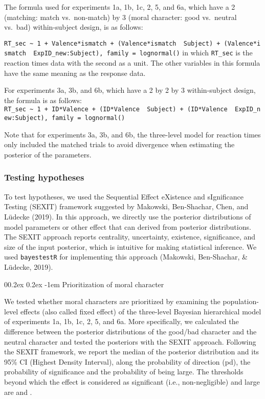 \documentclass[
  man]{apa6}
\makeatletter
\let\oldparagraph\paragraph
\renewcommand{\paragraph}[1]{\oldparagraph{#1}\mbox{}}
\renewcommand{\paragraph}{\@startsection{paragraph}{4}{\parindent}%
  {0\baselineskip \@plus 0.2ex \@minus 0.2ex}%
  {-1em}%
  {\normalfont\normalsize\bfseries\itshape\typesectitle}}
\makeatother
\begin{document}
The formula used for experiments 1a, 1b, 1c, 2, 5, and 6a, which have a 2 (matching: match vs.~non-match) by 3 (moral character: good vs.~neutral vs.~bad) within-subject design, is as follows:

\texttt{RT\_sec\ \textasciitilde{}\ 1\ +\ Valence*ismatch\ +\ (Valence*ismatch\ \textbar{}\ Subject)\ +\ (Valence*ismatch\ \textbar{}\ ExpID\_new:Subject),\ family\ =\ lognormal()}
in which \texttt{RT\_sec} is the reaction times data with the second as a unit. The other variables in this formula have the same meaning as the response data.

For experiments 3a, 3b, and 6b, which have a 2 by 2 by 3 within-subject design, the formula is as follows:
\texttt{RT\_sec\ \textasciitilde{}\ 1\ +\ ID*Valence\ +\ (ID*Valence\ \textbar{}\ Subject)\ +\ (ID*Valence\ \textbar{}\ ExpID\_new:Subject),\ family\ =\ lognormal()}

Note that for experiments 3a, 3b, and 6b, the three-level model for reaction times only included the matched trials to avoid divergence when estimating the posterior of the parameters.

\hypertarget{testing-hypotheses}{%
\subsubsection{Testing hypotheses}\label{testing-hypotheses}}

To test hypotheses, we used the Sequential Effect eXistence and sIgnificance Testing (SEXIT) framework suggested by Makowski, Ben-Shachar, Chen, and Lüdecke (2019). In this approach, we directly use the posterior distributions of model parameters or other effect that can derived from posterior distributions. The SEXIT approach reports centrality, uncertainty, existence, significance, and size of the input posterior, which is intuitive for making statistical inference. We used \texttt{bayestestR} for implementing this approach (Makowski, Ben-Shachar, \& Lüdecke, 2019).

\hypertarget{prioritization-of-moral-character}{%
\paragraph{Prioritization of moral character}\label{prioritization-of-moral-character}}

We tested whether moral characters are prioritized by examining the population-level effects (also called fixed effect) of the three-level Bayesian hierarchical model of experiments 1a, 1b, 1c, 2, 5, and 6a. More specifically, we calculated the difference between the posterior distributions of the good/bad character and the neutral character and tested the posteriors with the SEXIT approach. Following the SEXIT framework, we report the median of the posterior distribution and its 95\% CI (Highest Density Interval), along the probability of direction (pd), the probability of significance and the probability of being large. The thresholds beyond which the effect is considered as significant (i.e., non-negligible) and large are \textbar{} and \textbar.
\end{document}
